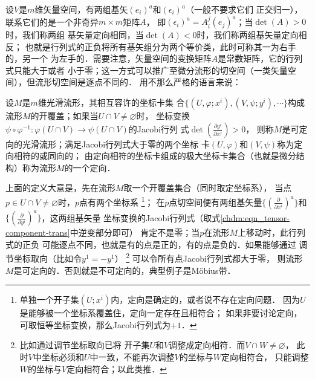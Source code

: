 设$V$是$m$维矢量空间，有两组基矢$(e_i)^a$和$(\epsilon_i)^a$（一般不要求它们
正交归一），联系它们的是一个非奇异$m\times m$矩阵$A$，
即$(\epsilon_i)^a = A_i^j (e_j)^a$；当$\det(A)>0$时，我们称两组
基矢量定向相同，当$\det(A)<0$时，我们称两组基矢量定向相反；
也就是行列式的正负将所有基矢组分为两个等价类，此时可称其一为右手的，另一个
为左手的．需要注意，矢量空间的变换矩阵$A$是常数矩阵，它的行列式只能大于或者
小于零；这一方式可以推广至微分流形的切空间（一类矢量空间），但流形切空间是逐点不同的．
用不那么严格的语言来说：


\begin{definition}\label{chdf:def_orientation}
    设$M$是$m$维光滑流形，其相互容许的坐标卡集
    合$\{(U,\varphi;x^i), (V,\psi;y^i), \cdots \}$构成
    流形$M$的开覆盖；如果当$U \cap V\neq \varnothing$时，
    坐标变换$\psi \circ \varphi^{-1}: \varphi(U \cap V )\to \psi(U \cap V)$的Jacobi行列
    式$\det(\frac{\partial y^i }{\partial x^j}) >0$，
    则称$M$是{\heiti 可定向}的光滑流形；满足Jacobi行列式大于零的两个坐标
    卡$(U,\varphi)$和$(V,\psi)$称为{\heiti 定向相符的}或{\heiti 同向的}；
    由定向相符的坐标卡组成的极大坐标卡集合（也就是微分结构）称为流形$M$的一个{\heiti 定向}．
\end{definition}

上面的定义大意是，先在流形$M$取一个开覆盖集合（同时取定坐标系），
当点$p\in U \cap V\neq \varnothing$时，$p$点有两个坐标系
{\footnote{单独一个开子集$(U;x^i)$内，定向是确定的，或者说不存在定向问题．
因为$U$是能够被一个坐标系覆盖住，定向一定存在且相符合；
如果非要讨论定向，可取恒等坐标变换，那么Jacobi行列式为$+1$．}}；
在$p$点切空间便有两组基矢量$\{(\frac{\partial }{\partial x^i})^a\}$和
$\{(\frac{\partial }{\partial y^i})^a\}$，这两组基矢量
坐标变换的Jacobi行列式（取式\eqref{chdm:eqn_tensor-component-trans}中逆变部分即可）
肯定不是零；当$p$在流形$M$上移动时，此行列式的正负
可能逐点不同，也就是有的点是正的，有的点是负的．如果能够通过
调节坐标取向（比如令$y^1=-y^1$） { \footnote{比如通过调节坐标取向已将
开子集$U$和$V$调整成定向相符．而$V\cap W\neq \varnothing$，
此时$V$中坐标必须和$U$中一致，不能再次调整$V$的坐标与$W$定向相符合，
只能调整$W$的坐标与$V$定向相符合；以此类推．}}
可以令所有点Jacobi行列式都大于零，
则流形$M$是可定向的．否则就是不可定向的，典型例子是M\"{o}bius带．

